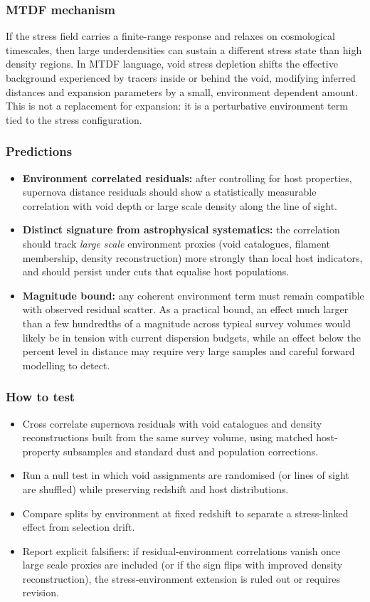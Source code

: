 \documentclass[11pt,a4paper]{article}
\begin{document}
\subsubsection{MTDF mechanism}
If the stress field carries a finite-range response and relaxes on cosmological timescales, then large underdensities can sustain a different stress state 
than high density regions. In MTDF language, void stress depletion shifts the effective background experienced by tracers inside or behind the void, 
modifying inferred distances and expansion parameters by a small, environment dependent amount. This is not a replacement for expansion: it is a perturbative 
environment term tied to the stress configuration.

\subsubsection{Predictions}
\begin{itemize}
  \item \textbf{Environment correlated residuals:} after controlling for host properties, supernova distance residuals should show a statistically measurable correlation with void depth or large scale density along the line of sight.
  \item \textbf{Distinct signature from astrophysical systematics:} the correlation should track \emph{large scale} environment proxies (void catalogues, filament membership, density reconstruction) more strongly than local host indicators, and should persist under cuts that equalise host populations.
  \item \textbf{Magnitude bound:} any coherent environment term must remain compatible with observed residual scatter. As a practical bound, an effect much larger than a few hundredths of a magnitude across typical survey volumes would likely be in tension with current dispersion budgets, while an effect below the percent level in distance may require very large samples and careful forward modelling to detect.
\end{itemize}

\subsubsection{How to test}
\begin{itemize}
  \item Cross correlate supernova residuals with void catalogues and density reconstructions built from the same survey volume, using matched host-property subsamples and standard dust and population corrections.
  \item Run a null test in which void assignments are randomised (or lines of sight are shuffled) while preserving redshift and host distributions.
  \item Compare splits by environment at fixed redshift to separate a stress-linked effect from selection drift.
  \item Report explicit falsifiers: if residual-environment correlations vanish once large scale proxies are included (or if the sign flips with improved density reconstruction), the stress-environment extension is ruled out or requires revision.
\end{itemize}
\end{document}
